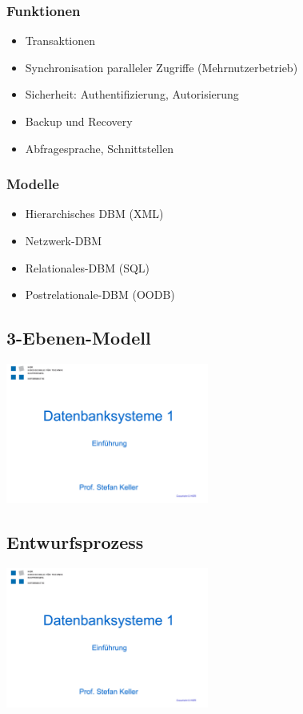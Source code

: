         \subsubsection{Funktionen}
            \begin{itemize}
              \item Transaktionen
              \item Synchronisation paralleler Zugriffe (Mehrnutzerbetrieb)
              \item Sicherheit: Authentifizierung, Autorisierung
              \item Backup und Recovery
              \item Abfragesprache, Schnittstellen
            \end{itemize}
        \subsubsection{Modelle}
            \begin{itemize}
                \item Hierarchisches DBM (XML)
                \item Netzwerk-DBM
                \item Relationales-DBM (SQL)
                \item Postrelationale-DBM (OODB)
            \end{itemize}
    \begin{multicols}{2}            
        \subsection{3-Ebenen-Modell}
            \includegraphics[page=22,trim=20 40 20 100,clip=true,width=0.5\textwidth]{images/einfuehrung.pdf}
        \subsection{Entwurfsprozess}
            \includegraphics[page=26,trim=20 20 20 85,clip=true,width=0.5\textwidth]{images/einfuehrung.pdf}
    \end{multicols}        